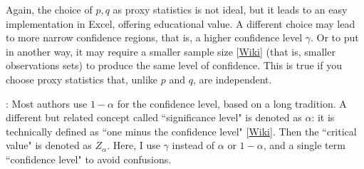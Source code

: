 \documentclass[10pt]{article}
\begin{document}
Again, the choice of $p,q$ as proxy statistics is not ideal, but it leads to an easy implementation in Excel, offering educational value. A different choice may lead to more narrow confidence regions, that is, a higher confidence level $\gamma$. Or to put in another way, it may require a smaller 
\textcolor{index}{sample size} [\href{https://en.wikipedia.org/wiki/Sample_size_determination}{Wiki}] (that is, smaller observations sets) to produce the same level of confidence. This is true if you choose proxy statistics that, unlike $p$ and $q$, are independent.

: Most authors use $1-\alpha$ for the \textcolor{index}{confidence level}, based on a long tradition. 
A different but related concept called ``significance level" is denoted as  $\alpha$: it is technically defined as
``one minus the confidence level" [\href{https://statisticsbyjim.com/hypothesis-testing/critical-value/}{Wiki}]. 
Then the ``critical value" is denoted as $Z_\alpha$. Here, I use $\gamma$ instead of $\alpha$ or $1-\alpha$, and a single term ``confidence level" to avoid confusions.

\quad \\
\end{document}
